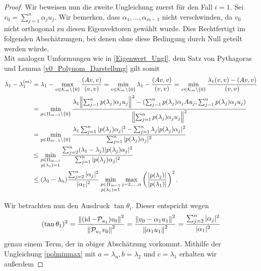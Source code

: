 \documentclass{article}
\begin{document}
\begin{theorem}
\begin{theorem}
\begin{proof}
	Wir beweisen nun die zweite Ungleichung zuerst für den Fall $i = 1$.
	Sei $v_0 = \sum_{j=1}^{n}\alpha_j u_j$. Wir bemerken, dass $\alpha_1, \dots, \alpha_{m-1}$ nicht verschwinden, da $v_0$ nicht orthogonal zu diesen Eigenvektoren gewählt wurde. Dies Rechtfertigt im folgenden Abschätzungen, bei denen ohne diese Bedingung durch Null geteilt werden würde.\\

	Mit analogen Umformungen wie in \eqref{Eigenwert_Ungl}, dem Satz von Pythagoras und Lemma \ref{v0_Polynom_Darstellung} gilt somit
	\begin{equation}
		\label{Ungl i=1}
		\begin{aligned}
			\lambda_1 - \lambda_1^{(m)} &= \lambda_1 - \max_{v \in \mathcal{K}_m \setminus\{0\}} \frac{(Av,v)}{(v,v)} = \min_{v \in \mathcal{K}_m\setminus\{0\}} \lambda_1 - \frac{(Av,v)}{(v,v)} = \min_{v \in \mathcal{K}_m\setminus\{0\}} \frac{\lambda_1(v,v) - (Av,v)}{(v,v)} \\ &= \min_{p\in \Pi_{m-1}\setminus \{0\}} \frac{\lambda_1 {\left \| \sum_{j=1}^{n}p(\lambda_j)\alpha_j u_j \right \|}_{}^2 - (\sum_{j=1}^{n}p(\lambda_j)\alpha_j A u_j,\sum_{j=1}^{n}p(\lambda_j)\alpha_j u_j)}{{\left \| \sum_{j=1}^{n}p(\lambda_j)\alpha_j u_j \right \|}_{}^2} \\
			&= \min_{p\in \Pi_{m-1}\setminus \{0\}} \frac{\lambda_1 \sum_{j=1}^{n} |p(\lambda_j)\alpha_j|^2 - \sum_{j=1}^{n} \lambda_j |p(\lambda_j)\alpha_j|^2 }{\sum_{j=1}^{n} |p(\lambda_j)\alpha_j|^2} \\
			&\le \min_{\substack{p\in \Pi_{m-1} \\ p(\lambda_1) =1}} \frac{\sum_{j=2}^{n} (\lambda_1 - \lambda_j)|p(\lambda_j)\alpha_j|^2}{\sum_{j=1}^{n} |p(\lambda_j)\alpha_j|^2} \\
			&\le (\lambda_1 - \lambda_n) \frac{\sum_{j=2}^{n} |\alpha_j|^2}{|\alpha_1|^2} \min_{\substack{p\in \Pi_{m-1} \\ p(\lambda_1) =1}} \max_{j=2,\dots,n} \left(\frac{|p(\lambda_j)|}{|p(\lambda_1)|}\right)^2.
		\end{aligned}
	\end{equation}

	Wir betrachten nun den Ausdruck $\tan \theta_i$. Dieser entspricht wegen
		\begin{equation*}
			(\tan\theta_1)^2 = \frac{{\left \| (\operatorname{id} - \mathcal{P}_{u_1})v_0 \right \|}_{}^2}{{\left \|  \mathcal{P}_{u_1}v_0 \right \|}_{}^2} = \frac{{\left \| v_0 - \alpha_1 u_1 \right \|}_{}^2}{{\left \| \alpha_1 u_1 \right \|}_{}^2} = \frac{\sum_{j=2}^{n} |\alpha_j|^2}{|\alpha_1|^2}
		\end{equation*}
	genau einem Term, der in obiger Abschätzung vorkommt.
	Mithilfe der Ungleichung \eqref{polminmax} mit $a = \lambda_n, b= \lambda_2$ und $c= \lambda_1$ erhalten wir außerdem


\end{proof}
\end{theorem}
\end{theorem}
\end{document}
